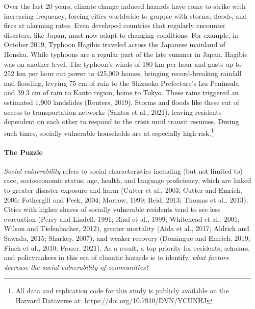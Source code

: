 \documentclass[]{elsarticle} %
\begin{document}
Over the last 20 years, climate change induced hazards have come to
strike with increasing frequency, forcing cities worldwide to grapple
with storms, floods, and fires at alarming rates. Even developed
countries that regularly encounter disasters, like Japan, must now adapt
to changing conditions. For example, in October 2019, Typhoon Hagibis
traveled across the Japanese mainland of Honshu. While typhoons are a
regular part of the late summer in Japan, Hagibis was on another level.
The typhoon's winds of 180 km per hour and gusts up to 252 km per hour
cut power to 425,000 homes, bringing record-breaking rainfall and
flooding, levying 75 cm of rain to the Shizuoka Prefecture's Izu
Peninsula and 39.3 cm of rain to Kanto region, home to Tokyo. These
rains triggered an estimated 1,900 landslides (Reuters, 2019). Storms
and floods like these cut of access to transportation networks (Santos
et al., 2021), leaving residents dependent on each other to respond to
the crisis until transit resumes. During such times, socially vulnerable
households are at especially high risk.\footnote{All data and
  replication code for this study is publicly available on the Harvard
  Dataverse at: https://doi.org/10.7910/DVN/YCUNHJ}

\hypertarget{the-puzzle}{%
\paragraph{The Puzzle}\label{the-puzzle}}

\emph{Social vulnerability} refers to social characteristics including
(but not limited to) race, socioeconomic status, age, health, and
language proficiency, which are linked to greater disaster exposure and
harm (Cutter et al., 2003; Cutter and Emrich, 2006; Fothergill and Peek,
2004; Morrow, 1999; Reid, 2013; Thomas et al., 2013). Cities with higher
shares of socially vulnerable residents tend to see less evacuation
(Perry and Lindell, 1991; Riad et al., 1999; Whitehead et al., 2001;
Wilson and Tiefenbacher, 2012), greater mortality (Aida et al., 2017;
Aldrich and Sawada, 2015; Sharkey, 2007), and weaker recovery (Domingue
and Emrich, 2019; Finch et al., 2010; Fraser, 2021). As a result, a top
priority for residents, scholars, and policymakers in this era of
climatic hazards is to identify, \emph{what factors decrease the social
vulnerability of communities?}
\end{document}
